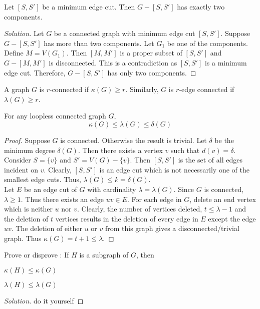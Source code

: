 \begin{exercise}
	Let $[S,S']$ be a minimum edge cut. Then $G-[S,S']$ has exactly two components.
\end{exercise}
\begin{proof}[Solution]
	Let $G$ be a connected graph with minimum edge cut $[S,S']$. Suppose $G-[S,S']$ has more than two components. Let $G_1$ be one of the components. Define $M = V(G_1)$. Then $[M,M']$ is a proper subset of $[S,S']$ and $G-[M,M']$ is disconnected. This is a contradiction as $[S,S']$ is a minimum edge cut. Therefore, $G - [S,S']$ has only two components.
\end{proof}

\begin{definition}
	A graph $G$ is $r$-connected if $\kappa(G) \ge r$. Similarly, $G$ is $r$-edge connected if $\lambda(G) \ge r$.
\end{definition}

\begin{theorem}
	For any loopless connected graph $G$,
	$$ \kappa(G) \le \lambda(G) \le \delta(G) $$
\end{theorem}
\begin{proof}
	Suppose $G$ is connected. Otherwise the result is trivial. Let $\delta$ be the minimum degree $\delta(G)$. Then there exists a vertex $v$ such that $d(v) = \delta$. Consider $S = \{v\}$ and $S'= V(G)-\{v\}$. Then $[S,S']$ is the set of all edges incident on $v$. Clearly, $[S,S']$ is an edge cut which is not necessarily one of the smallest edge cuts. Thus, $\lambda(G) \le k = \delta(G)$.\\

	Let $E$ be an edge cut of $G$ with cardinality $\lambda = \lambda(G)$. Since $G$ is connected, $\lambda \ge 1$. Thus there exists an edge $uv \in E$. For each edge in $G$, delete an end vertex which is neither $u$ nor $v$. Clearly, the number of vertices deleted, $t \le \lambda-1$ and the deletion of $t$ vertices results in the deletion of every edge in $E$ except the edge $uv$. The deletion of either $u$ or $v$ from this graph gives a disconnected/trivial graph. Thus $\kappa(G) = t+1 \le \lambda$.
\end{proof}

\begin{exercise}
Prove or disprove : If $H$ is a subgraph of $G$, then\\ \begin{enumerate*} \item $\kappa(H) \le \kappa(G)$ \item $\lambda(H) \le \lambda(G)$ \end{enumerate*}
\end{exercise}
\begin{proof}[Solution]
	do it yourself
\end{proof}

